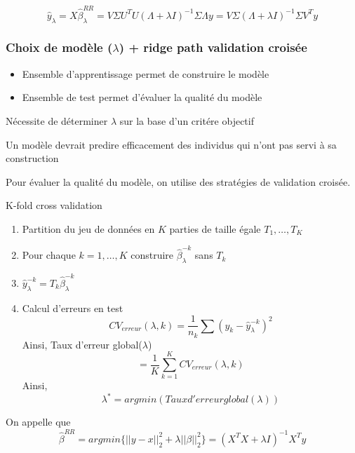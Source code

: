\documentclass{article}
\begin{document}
\begin{equation}
\hat{y}_\lambda=X\hat{\beta}_\lambda^{RR}=V\Sigma U^TU(\Lambda+\lambda I)^{-1}\Sigma\Lambda y=V\Sigma(\Lambda+\lambda I)^{-1}\Sigma V^T y
\end{equation}

\subsubsection{Choix de mod\`ele ($\lambda$) + ridge path validation crois\'ee}
\begin{itemize}
        \item Ensemble d'apprentissage permet de construire le mod\`ele
        \item Ensemble de test permet d'\'evaluer la qualit\'e du mod\`ele 
\end{itemize}

N\'ecessite de d\'eterminer $\lambda$ sur la base d'un crit\'ere objectif

Un mod\`ele devrait predire efficacement des individus qui n'ont pas servi \`a sa construction

Pour \'evaluer la qualit\'e du mod\`ele, on utilise des strat\'egies de validation crois\'ee.

K-fold cross validation
\begin{enumerate}
\item Partition du jeu de donn\'ees en $K$ parties de taille \'egale $T_1,\ldots,T_K$
\item Pour chaque $k=1,\ldots,K$ construire $\hat{\beta}_\lambda^{-k}$ sans $T_k$
\item $\hat{y}_\lambda^{-k}=T_k\hat{\beta}_\lambda^{-k}$
\item Calcul d'erreurs en test
\begin{equation}
CV_{erreur}(\lambda,k)=\frac{1}{n_k}\sum(y_k-\hat{y}_\lambda^{-k})^2
\end{equation}
Ainsi, Taux d'erreur global($\lambda$)
\begin{equation}
=\frac{1}{K}\sum_{k=1}^KCV_{erreur}(\lambda,k)
\end{equation}
Ainsi,
\begin{equation}
\lambda^*=argmin(Taux d'erreur global(\lambda))
\end{equation}
\end{enumerate}

On appelle que 
\begin{equation}
\hat{\beta}^{RR}=argmin\{||y-x||^2_2+\lambda||\beta||_2^2\}=(X^TX+\lambda I)^{-1}X^Ty
\end{equation}
\end{document}
